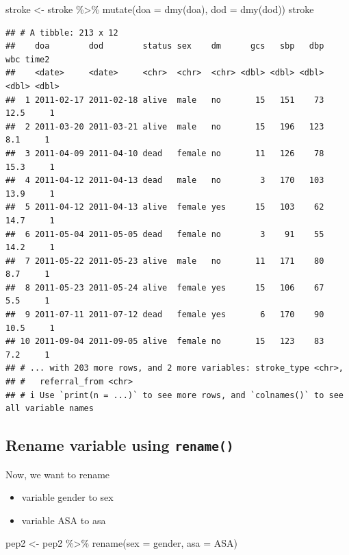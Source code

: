 \documentclass[
  10pt,
]{krantz}
\newenvironment{Shaded}{\begin{snugshade}}{\end{snugshade}}
\newcommand{\AttributeTok}[1]{\textcolor[rgb]{0.77,0.63,0.00}{#1}}
\newcommand{\FunctionTok}[1]{\textcolor[rgb]{0.00,0.00,0.00}{#1}}
\newcommand{\NormalTok}[1]{#1}
\newcommand{\OtherTok}[1]{\textcolor[rgb]{0.56,0.35,0.01}{#1}}
\newcommand{\SpecialCharTok}[1]{\textcolor[rgb]{0.00,0.00,0.00}{#1}}
\providecommand{\tightlist}{%
  \setlength{\itemsep}{0pt}\setlength{\parskip}{0pt}}
\begin{document}
\begin{Shaded}
\begin{Highlighting}[]
\NormalTok{stroke }\OtherTok{\textless{}{-}}\NormalTok{ stroke }\SpecialCharTok{\%\textgreater{}\%} \FunctionTok{mutate}\NormalTok{(}\AttributeTok{doa =} \FunctionTok{dmy}\NormalTok{(doa), }\AttributeTok{dod =} \FunctionTok{dmy}\NormalTok{(dod))}
\NormalTok{stroke}
\end{Highlighting}
\end{Shaded}

\begin{verbatim}
## # A tibble: 213 x 12
##    doa        dod        status sex    dm      gcs   sbp   dbp   wbc time2
##    <date>     <date>     <chr>  <chr>  <chr> <dbl> <dbl> <dbl> <dbl> <dbl>
##  1 2011-02-17 2011-02-18 alive  male   no       15   151    73  12.5     1
##  2 2011-03-20 2011-03-21 alive  male   no       15   196   123   8.1     1
##  3 2011-04-09 2011-04-10 dead   female no       11   126    78  15.3     1
##  4 2011-04-12 2011-04-13 dead   male   no        3   170   103  13.9     1
##  5 2011-04-12 2011-04-13 alive  female yes      15   103    62  14.7     1
##  6 2011-05-04 2011-05-05 dead   female no        3    91    55  14.2     1
##  7 2011-05-22 2011-05-23 alive  male   no       11   171    80   8.7     1
##  8 2011-05-23 2011-05-24 alive  female yes      15   106    67   5.5     1
##  9 2011-07-11 2011-07-12 dead   female yes       6   170    90  10.5     1
## 10 2011-09-04 2011-09-05 alive  female no       15   123    83   7.2     1
## # ... with 203 more rows, and 2 more variables: stroke_type <chr>,
## #   referral_from <chr>
## # i Use `print(n = ...)` to see more rows, and `colnames()` to see all variable names
\end{verbatim}

\hypertarget{rename-variable-using-rename}{%
\subsection{\texorpdfstring{Rename variable using \texttt{rename()}}{Rename variable using rename()}}\label{rename-variable-using-rename}}

Now, we want to rename

\begin{itemize}
\tightlist
\item
  variable gender to sex
\item
  variable ASA to asa
\end{itemize}

\begin{Shaded}
\begin{Highlighting}[]
\NormalTok{pep2 }\OtherTok{\textless{}{-}}\NormalTok{ pep2 }\SpecialCharTok{\%\textgreater{}\%} \FunctionTok{rename}\NormalTok{(}\AttributeTok{sex =}\NormalTok{ gender,}
                        \AttributeTok{asa =}\NormalTok{ ASA)}
\end{Highlighting}
\end{Shaded}
\end{document}
